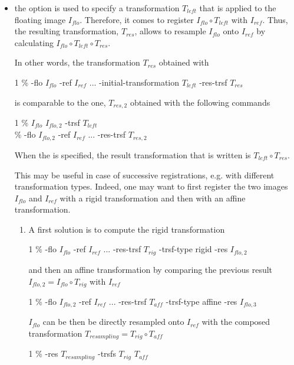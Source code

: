 \begin{itemize}

\item the option  is
  used to specify a transformation $T_{left}$ that is applied to the
  floating image $I_{flo}$. Therefore, it comes to register $I_{flo}
  \circ T_{left}$ with $I_{ref}$. Thus, the resulting transformation,
  $T_{res}$, allows to resample $I_{flo}$ onto $I_{ref}$ by
  calculating $I_{flo} \circ T_{left} \circ T_{res}$.

In other words, the transformation $T_{res}$ obtained with
\begin{code}{1}
\% \blockmatching -flo $I_{flo}$ -ref $I_{ref}$ ... -initial-transformation $T_{left}$  -res-trsf $T_{res}$
\end{code}
is comparable to the one, $T_{res,2}$ obtained with the following commands
\begin{code}{1}
\% \applyTrsf $I_{flo}$ $I_{flo,2}$ -trsf $T_{left}$ \\
\% \blockmatching -flo $I_{flo,2}$ -ref $I_{ref}$ ... -res-trsf $T_{res,2}$
\end{code}

\begin{note}
When the  is specified, the
result transformation that is written is $T_{left} \circ T_{res}$. 
\end{note}

This may be useful in case of successive registrations, e.g. with
different transformation types. Indeed, one may want to first register
the two images $I_{flo}$ and $I_{ref}$ with a rigid transformation and
then with an affine transformation.

\begin{enumerate}
\item A first solution is to compute the rigid transformation
\begin{code}{1}
\% \blockmatching -flo $I_{flo}$ -ref $I_{ref}$ ... -res-trsf
$T_{rig}$ -trsf-type rigid -res $I_{flo,2}$
\end{code}
and then an affine transformation by comparing the previous result
$I_{flo,2} = I_{flo} \circ T_{rig}$ with $I_{ref}$
\begin{code}{1}
\% \blockmatching -flo $I_{flo,2}$ -ref $I_{ref}$ ... -res-trsf
$T_{aff}$ -trsf-type affine -res $I_{flo,3}$
\end{code}
$I_{flo}$ can be then be directly resampled onto $I_{ref}$ with the
composed transformation $T_{resampling} = T_{rig} \circ T_{aff}$
\begin{code}{1}
\% \composeTrsf -res $T_{resampling}$ -trsfs $T_{rig}$ $T_{aff}$
\end{code}


\end{enumerate}
\end{itemize}
